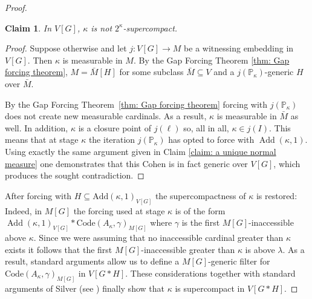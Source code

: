 \documentclass[11pt]{amsart}
\newtheorem{claim}{Claim}[theorem]
\theoremstyle{definition}
\theoremstyle{remark}
\newcommand\<{{<}}
\DeclareMathOperator{\Add}{Add}
\def\s{\subseteq}
\begin{document}
\begin{proof}
\begin{claim}
    In $V[G]$, $\kappa$ is not $2^\kappa$-supercompact.
\end{claim}
\begin{proof}
    Suppose otherwise and let $j\colon V[G]\rightarrow M$ be a witnessing embedding in $V[G]$. Then $\kappa$ is measurable in $M$. By the Gap Forcing Theorem \ref{thm: Gap forcing theorem}, $M=\bar{M}[H]$ for some subclass $\bar{M}\s V$ and a $j(\mathbb{P}_\kappa)$-generic $H$ over $\bar{M}$. 

  By the Gap Forcing Theorem~\ref{thm: Gap forcing theorem} forcing with $j(\mathbb{P}_\kappa)$ does not create new measurable cardinals. As a result, $\kappa$ is measurable in $\bar{M}$ as well. In addition, $\kappa$ is a closure point of $j(\ell)$  so, all in all, $\kappa\in j(I)$. This means that at stage $\kappa$ the iteration $j(\mathbb{P}_\kappa)$ has opted to force with $\Add(\kappa,1)$. Using exactly the same argument given in Claim \ref{claim: a unique normal measure} one demonstrates that this Cohen is in fact generic over $V[G]$, which produces the sought contradiction.
   
 \end{proof}
After forcing with  $H\s \mathrm{Add}(\kappa,1)_{V[G]}$ the supercompactness of $\kappa$ is restored: Indeed,  in $M[G]$ the forcing used at stage $\kappa$ is of the form $\Add(\kappa,1)_{V[G]}\ast \mathrm{Code}(A_\kappa,\gamma)_{M[G]}$ where $\gamma$ is the first $M[G]$-inaccessible above $\kappa$. Since we were assuming that no inaccessible cardinal greater than $\kappa$ exists it follows that the first $M[G]$-inaccessible greater than $\kappa$ is above $\lambda$. As a result, standard arguments allow us to define a $M[G]$-generic filter for $\mathrm{Code}(A_\kappa,\gamma)_{M[G]}$ in $V[G\ast H]$. These considerations together with standard arguments of Silver (see \cite[Theorem~12.6]{CummingsHandbook}) finally show that $\kappa$ is supercompact in $V[G\ast H]$.
\end{proof}







 

\end{document}
